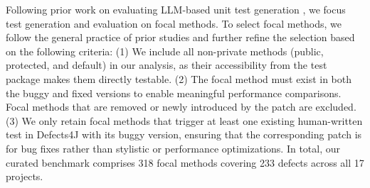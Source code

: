 \documentclass[acmsmall]{acmart}
\begin{document}
Following prior work on evaluating LLM-based unit test generation \cite{OnLLMUTGenEvalASE2024, EvalImprChatgptUTGenFSE2024, EmpEvalforLLMUTAutoGenTSE}, we focus test generation and evaluation on focal methods. To select focal methods, we follow the general practice of prior studies \cite{OnLLMUTGenEvalASE2024, A3TestIST, UnitTestCaseGenTrans} and further refine the selection based on the following criteria:
(1) We include all non-private methods (public, protected, and default) in our analysis, as their accessibility from the test package makes them directly testable.
(2) The focal method must exist in both the buggy and fixed versions to enable meaningful performance comparisons. Focal methods that are removed or newly introduced by the patch are excluded.
(3) We only retain focal methods that trigger at least one existing human-written test in Defects4J with its buggy version, ensuring that the corresponding patch is for bug fixes rather than stylistic or performance optimizations. In total, our curated benchmark comprises 318 focal methods covering 233 defects across all 17 projects.


\end{document}
